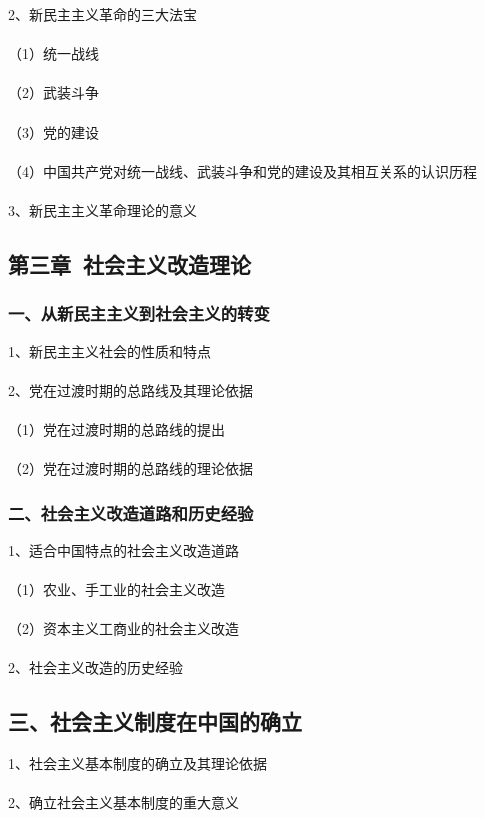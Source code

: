 \documentclass{ctexart}
\begin{document}
2、新民主主义革命的三大法宝
\\\\
（1）统一战线
\\\\
（2）武装斗争
\\\\
（3）党的建设
\\\\
（4）中国共产党对统一战线、武装斗争和党的建设及其相互关系的认识历程
\\\\

3、新民主主义革命理论的意义

\subsection{第三章\ 社会主义改造理论}
\subsubsection{一、从新民主主义到社会主义的转变}
1、新民主主义社会的性质和特点
\\\\

2、党在过渡时期的总路线及其理论依据
\\\\
（1）党在过渡时期的总路线的提出
\\\\
（2）党在过渡时期的总路线的理论依据

\subsubsection{二、社会主义改造道路和历史经验}
1、适合中国特点的社会主义改造道路
\\\\
（1）农业、手工业的社会主义改造
\\\\
（2）资本主义工商业的社会主义改造
\\\\

2、社会主义改造的历史经验

\subsection{三、社会主义制度在中国的确立}
1、社会主义基本制度的确立及其理论依据
\\\\

2、确立社会主义基本制度的重大意义
\end{document}
